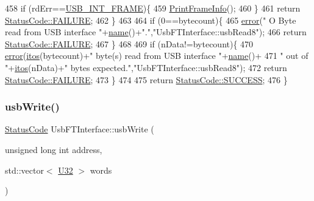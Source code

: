 \begin{DoxyCode}
458     \textcolor{keywordflow}{if} (rdErr==\hyperlink{LALUsbML_8h_a68260f9cf3649507d12904cfa1592c11afd1c409187b1dfd3d66887a5e07e7ed3}{USB\_INT\_FRAME})\{
459       \hyperlink{LALUsbML_8h_ab3398c17204ba7fb4b47eb9bbf4ba94e}{PrintFrameInfo}();
460     \} 
461     \textcolor{keywordflow}{return} \hyperlink{classStatusCode_a6f565cbeadc76d14c72f047e5e85eb4ba3da73d4c469762eb9d3c960368252b26}{StatusCode::FAILURE};
462   \}
463   
464   \textcolor{keywordflow}{if} (0==bytecount)\{
465     \hyperlink{classObject_a204a95f57818c0f811933917a30eff45}{error}(\textcolor{stringliteral}{" O Byte read from USB interface "}+\hyperlink{classObject_a300f4c05dd468c7bb8b3c968868443c1}{name}()+\textcolor{stringliteral}{"."},\textcolor{stringliteral}{"UsbFTInterface::usbRead8"});
466     \textcolor{keywordflow}{return} \hyperlink{classStatusCode_a6f565cbeadc76d14c72f047e5e85eb4ba3da73d4c469762eb9d3c960368252b26}{StatusCode::FAILURE};
467   \}
468 
469   \textcolor{keywordflow}{if} (nData!=bytecount)\{
470     \hyperlink{classObject_a204a95f57818c0f811933917a30eff45}{error}(\hyperlink{Tools_8h_af330027dbdafb9a30768b3613c553e60}{itos}(bytecount)+\textcolor{stringliteral}{" byte(s) read from USB interface "}+\hyperlink{classObject_a300f4c05dd468c7bb8b3c968868443c1}{name}()+
471             \textcolor{stringliteral}{" out of "}+\hyperlink{Tools_8h_af330027dbdafb9a30768b3613c553e60}{itos}(nData)+\textcolor{stringliteral}{" bytes expected."},\textcolor{stringliteral}{"UsbFTInterface::usbRead8"});
472     \textcolor{keywordflow}{return} \hyperlink{classStatusCode_a6f565cbeadc76d14c72f047e5e85eb4ba3da73d4c469762eb9d3c960368252b26}{StatusCode::FAILURE};    
473   \}
474 
475   \textcolor{keywordflow}{return} \hyperlink{classStatusCode_a6f565cbeadc76d14c72f047e5e85eb4badd0da38d3ba0d922efd1f4619bc37ad8}{StatusCode::SUCCESS};
476 \}
\end{DoxyCode}
\mbox{\label{classUsbFTInterface_ab7bf021f1fa3af385234e639c84827ef}} 
\subsubsection{\texorpdfstring{usb\+Write()}{usbWrite()}}
{\footnotesize\ttfamily \hyperlink{classStatusCode}{Status\+Code} Usb\+F\+T\+Interface\+::usb\+Write (\begin{DoxyParamCaption}\item[{unsigned long int}]{address,  }\item[{std\+::vector$<$ \hyperlink{classUsbFTInterface_aee2201fe4d977aa03568fa8dbacc39ba}{U32} $>$}]{words }\end{DoxyParamCaption})}

